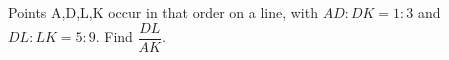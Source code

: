 Points A,D,L,K occur in that order on a line, with $AD:DK=1:3$ and $DL:LK=5:9$. Find $\dfrac{DL}{AK}$.

